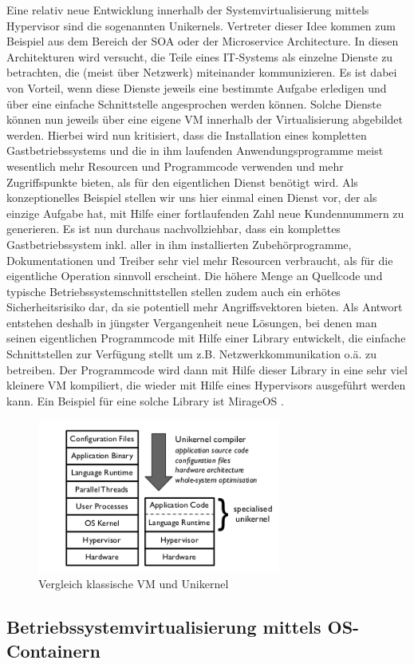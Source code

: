 Eine relativ neue Entwicklung innerhalb der Systemvirtualisierung mittels Hypervisor sind die sogenannten Unikernels. Vertreter dieser Idee kommen zum Beispiel aus dem Bereich der \ac{SOA} oder der Microservice Architecture. In diesen Architekturen wird versucht, die Teile eines IT-Systems als einzelne Dienste zu betrachten, die (meist über Netzwerk) miteinander kommunizieren. Es ist dabei von Vorteil, wenn diese Dienste jeweils eine bestimmte Aufgabe erledigen und über eine einfache Schnittstelle angesprochen werden können. Solche Dienste können nun jeweils über eine eigene \ac{VM} innerhalb der Virtualisierung abgebildet werden. Hierbei wird nun kritisiert, dass die Installation eines kompletten Gastbetriebssystems und die in ihm laufenden Anwendungsprogramme meist wesentlich mehr Resourcen und Programmcode verwenden und mehr Zugriffspunkte bieten, als für den eigentlichen Dienst benötigt wird. Als konzeptionelles Beispiel stellen wir uns hier einmal einen Dienst vor, der als einzige Aufgabe hat, mit Hilfe einer fortlaufenden Zahl neue Kundennummern zu generieren. Es ist nun durchaus nachvollziehbar, dass ein komplettes Gastbetriebssystem inkl. aller in ihm installierten Zubehörprogramme, Dokumentationen und Treiber sehr viel mehr Resourcen verbraucht, als für die eigentliche Operation sinnvoll erscheint. Die höhere Menge an Quellcode und typische Betriebssystemschnittstellen stellen zudem auch ein erhötes Sicherheitsrisiko dar, da sie potentiell mehr Angriffsvektoren bieten. Als Antwort entstehen deshalb in jüngster Vergangenheit neue Lösungen, bei denen man seinen eigentlichen Programmcode mit Hilfe einer Library entwickelt, die einfache Schnittstellen zur Verfügung stellt um z.B. Netzwerkkommunikation o.ä. zu betreiben. Der Programmcode wird dann mit Hilfe dieser Library in eine sehr viel kleinere \ac{VM} kompiliert, die wieder mit Hilfe eines Hypervisors ausgeführt werden kann. Ein Beispiel für eine solche Library ist MirageOS \citep[Vgl.][]{MadMorAnd13}.

\begin{figure}[!ht]
  \begin{center}
    \includegraphics[width=8cm]{bilder/comparison-vm-unikernel.png}
    \caption{Vergleich klassische VM und Unikernel \citep[Abb. 1]{MadMorAnd13}}
  \end{center}
\end{figure}

\subsection{Betriebssystemvirtualisierung mittels OS-Containern}
